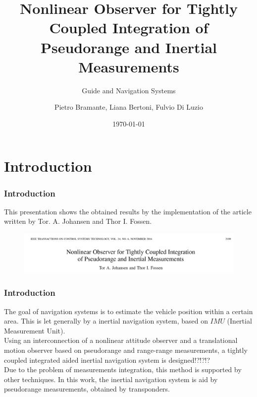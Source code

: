 \documentclass{beamer}
\title{Nonlinear Observer for Tightly Coupled Integration of Pseudorange and Inertial Measurements}
\subtitle{Guide and Navigation Systems}
\author{Pietro Bramante, Liana Bertoni, Fulvio Di Luzio}
\institute{Universit\`a degli Studi di Pisa \\ Master's Degree in Robotics and Automation Engineering}
\date{\today}
\begin{document}
    \begin{frame}
	\titlepage
	\end{frame}	


\section{Introduction}
	\begin{frame}
	\frametitle{Introduction}
		This presentation shows the obtained results by the implementation of the article written by Tor. A. Johansen and Thor I. Fossen.
		\vspace{0.5cm}
		
	\begin{figure}[H]
			\centering
			\includegraphics[scale=0.3]{title}
		\end{figure}
	\end{frame}

	\begin{frame}
	\frametitle{Introduction}
	The goal of navigation systems is to estimate the vehicle position within a certain area. This is let generally by a inertial navigation system, based on $IMU$ (Inertial Measurement Unit).\\
	
	Using an interconnection of a nonlinear attitude observer and a translational motion observer based on pseudorange and range-range measurements, a tightly coupled integrated aided inertial navigation system is designed!?!?!?\\
	
	Due to the problem of measurements integration, this method is supported by other techniques. In this work, the inertial navigation system is aid by pseudorange measurements, obtained by transponders.
	\end{frame}
\end{document}
